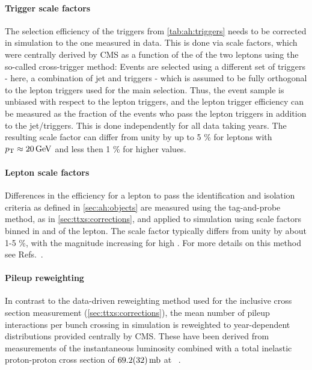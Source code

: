 \paragraph{Trigger scale factors}

The selection efficiency of the triggers from \cref{tab:ah:triggers} needs to be corrected in simulation to the one measured in data. This is done via scale factors, which were centrally derived by CMS as a function of the \pt of the two leptons using the so-called cross-trigger method: Events are selected using a different set of triggers - here, a combination of jet and \ptmiss triggers - which is assumed to be fully orthogonal to the lepton triggers used for the main selection. Thus, the event sample is unbiased with respect to the lepton triggers, and the lepton trigger efficiency can be measured as the fraction of the events who pass the lepton triggers in addition to the jet/\ptmiss triggers. This is done independently for all data taking years. The resulting scale factor can differ from unity by up to 5 \% for leptons with $\pt \approx \SI{20}{\GeV}$ and less then 1 \% for higher \pt values.

\paragraph{Lepton scale factors}

Differences in the efficiency for a lepton to pass the identification and isolation criteria as defined in \cref{sec:ah:objects} are measured using the tag-and-probe method, as in \cref{sec:ttxs:corrections}, and applied to simulation using scale factors binned in \pt and \abseta of the lepton. The scale factor typically differs from unity by about 1-5 \%, with the magnitude increasing for high \abseta. For more details on this method see Refs.~\cite{CMS:EGM-17-001,CMS:MUO-16-001}.

\paragraph{Pileup reweighting}

In contrast to the data-driven reweighting method used for the inclusive \ttbar cross section measurement (\cref{sec:ttxs:corrections}), the mean number of pileup interactions per bunch crossing in simulation is reweighted to year-dependent distributions provided centrally by CMS. These have been derived from measurements of the instantaneous luminosity combined with a total inelastic proton-proton cross section of $\SI{69.2 \pm 3.2}{\milli\barn}$ at \sqrtsRII~\cite{CMS:LUM-17-003}.



